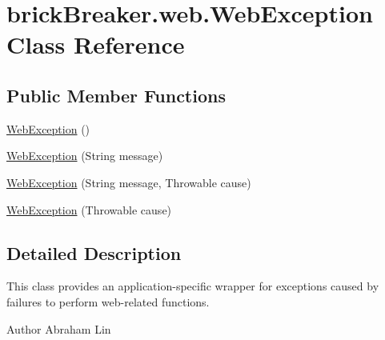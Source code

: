 \hypertarget{classbrick_breaker_1_1web_1_1_web_exception}{
\section{brickBreaker.web.WebException Class Reference}
\label{classbrick_breaker_1_1web_1_1_web_exception}
}
\subsection*{Public Member Functions}
\begin{DoxyCompactItemize}
\item 
\hyperlink{classbrick_breaker_1_1web_1_1_web_exception_a2f0867d6facf3647c37b8acf4bcef16a}{WebException} ()
\item 
\hyperlink{classbrick_breaker_1_1web_1_1_web_exception_af02e7ea5958f56cfe748bd6e332487e1}{WebException} (String message)
\item 
\hyperlink{classbrick_breaker_1_1web_1_1_web_exception_a2ef20379c84581f51570f9cae306a3f0}{WebException} (String message, Throwable cause)
\item 
\hyperlink{classbrick_breaker_1_1web_1_1_web_exception_a0fec67ad1b856715b5c5d9505fa65506}{WebException} (Throwable cause)
\end{DoxyCompactItemize}


\subsection{Detailed Description}
This class provides an application-\/specific wrapper for exceptions caused by failures to perform web-\/related functions.

\begin{DoxyAuthor}{Author}
Abraham Lin 
\end{DoxyAuthor}



